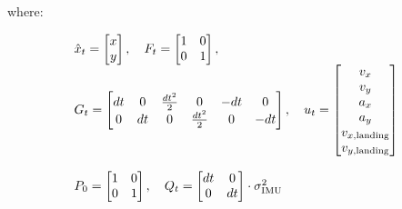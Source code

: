 \documentclass[conference, onecolumn, draftclsnofoot]{IEEEtran}
\begin{document}
where:

\begin{equation*}
\begin{array}{l}


 \hat{x}_{t} = \begin{bmatrix} 
                x \\ 
                y
                \end{bmatrix} ,  \quad
F_{t} = \begin{bmatrix} 
                1 & 0 \\ 
                0 & 1
                \end{bmatrix}      , \\
G_{t} =   \begin{bmatrix} 
                dt & 0 & \frac{dt^{2}}{2} & 0 & -dt & 0\\ 
                0 & dt & 0 & \frac{dt^{2}}{2} &0 & -dt
                \end{bmatrix} , \quad
u_{t} = \begin{bmatrix} 
                v_x \\ 
                v_y \\
                a_x \\
                a_y \\
                v_{x,\textrm{landing}}\\
                v_{y,\textrm{landing}}
                \end{bmatrix}  \\ \\
                
P_{0} =  \begin{bmatrix} 
                1 & 0 \\ 
                0 & 1
                \end{bmatrix}   , \quad 
Q_{t}  =\begin{bmatrix} 
                dt & 0 \\ 
                0 & dt
                \end{bmatrix} \cdot \sigma^{2}_{\textrm{IMU}}
\end{array} \\
\end{equation*}
\end{document}
